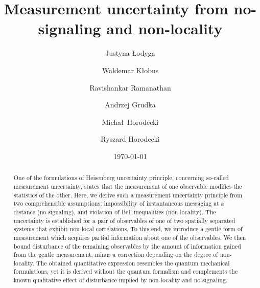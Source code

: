 \documentclass[pra,twocolumn,showpacs,preprintnumbers,amsmath,amssymb,superscriptaddress]{revtex4-1}
\begin{document}
\title{Measurement uncertainty from no-signaling and non-locality}

\author{Justyna \L{}odyga}

\author{Waldemar K\l{}obus}

\author{Ravishankar Ramanathan}

\author{Andrzej Grudka}

\author{Micha\l\ Horodecki}

\author{Ryszard Horodecki}


\date{\today}


\begin{abstract}
One of the formulations of Heisenberg uncertainty principle, concerning so-called measurement uncertainty, states that the measurement of one observable modifies the statistics of the other. Here, we derive such a measurement uncertainty principle from two comprehensible assumptions: impossibility of instantaneous messaging at a distance (no-signaling), and violation of Bell inequalities (non-locality). The uncertainty is established for a pair of observables of one of two spatially
separated systems that exhibit non-local correlations. To this end, we introduce a gentle form of measurement which acquires
partial information about one of the observables. We then bound disturbance of the remaining observables
by the amount of information gained from the gentle measurement, minus a correction depending on the degree of non-locality.
The obtained quantitative expression resembles the quantum mechanical formulations, yet it is derived without the quantum formalism and complements the known qualitative effect of disturbance implied by non-locality and no-signaling.
\end{abstract}
\end{document}
